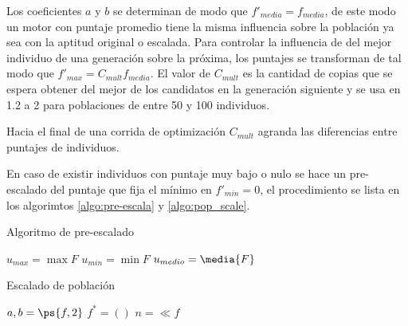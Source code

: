 Los coeficientes $a$ y $b$ se determinan de modo que $f'_{media}=f_{media}$, de
este modo un motor con puntaje promedio tiene la misma influencia sobre la
población ya sea con la aptitud original o escalada.
%
Para controlar la influencia de  del mejor individuo de una generación sobre la
próxima, los puntajes se transforman de tal modo que
$f'_{max}=C_{mult}f_{media}$.
%
El valor de $C_{mult}$ es la cantidad de copias que se espera obtener del mejor
de los candidatos en la generación siguiente y se usa en 1.2 a 2 para
poblaciones de entre 50 y 100 individuos.

Hacia el final de una corrida de optimización $C_{mult}$ agranda las diferencias
entre puntajes de individuos.

En caso de existir individuos con puntaje muy bajo o nulo se hace un
pre-escalado del puntaje que fija el mínimo en $f'_{min}=0$, el procedimiento se
lista en los algorimtos \ref{algo:pre-escala} y \ref{algo:pop_scale}.


\begin{algorithm} \caption{Algoritmo de pre-escalado}\label{algo:pre-escala}
  \BlankLine

  $u_{max} = \max{F}$\;
  $u_{min} = \min{F}$\;
  $u_{medio} = \media{F}$\;
\end{algorithm}


\begin{algorithm}\caption{Escalado de población}\label{algo:pop_scale}
  \BlankLine

  $a, b = \ps{f, 2}$\;
  $f^{*} = ()$ \;
  $n = \ll{f}$\;
  \;
\end{algorithm}

